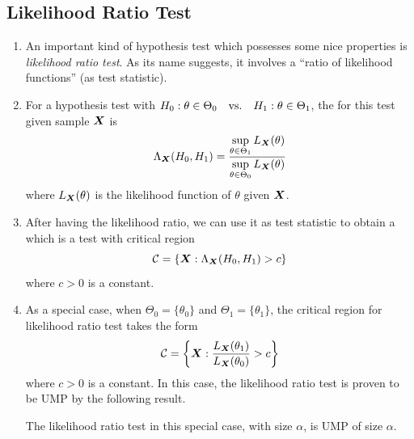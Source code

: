 \subsection{Likelihood Ratio Test}
\begin{enumerate}
\item An important kind of hypothesis test which possesses some nice properties
is \emph{likelihood ratio test}. As its name suggests, it involves a ``ratio
of likelihood functions'' (as test statistic).

\item For a hypothesis test with
\(H_0:\theta\in\Theta_0\qqtext{vs.}H_1:\theta\in\Theta_1\), the
 for this test given sample \(\vb*{X}\) is
\[
\Lambda_{\vb*{X}}(H_0,H_1)=\frac{\displaystyle \sup_{\theta\in\Theta_1}L_{\vb*{X}}\qty(\theta)}
{\displaystyle \sup_{\theta\in\Theta_0}L_{\vb*{X}}\qty(\theta)}
\]
where \(L_{\vb*{X}}\qty(\theta)\) is the likelihood function of \(\theta\) given
\(\vb*{X}\).

\item After having the likelihood ratio, we can use it as test statistic to
obtain a  which is a test with critical region
\[
\mathcal{C}=\{\vb*{X}:\Lambda_{\vb*{X}}(H_0,H_1)>c\}
\]
where \(c>0\) is a constant.

\item As a special case, when \(\Theta_0=\{\theta_0\}\) and
\(\Theta_1=\{\theta_1\}\), the critical region for likelihood ratio test takes
the form
\[
\mathcal{C}=\qty{\vb*{X}:\frac{L_{\vb*{X}}\qty(\theta_1)}{L_{\vb*{X}}\qty(\theta_0)}>c}
\]
where \(c>0\) is a constant.
In this case, the likelihood ratio test is proven to be UMP by the following
result.
\begin{theorem}
\label{thm:neyman-pearson}
The likelihood ratio test in this special case, with size \(\alpha\), is UMP of
size \(\alpha\).
\end{theorem}
\end{enumerate}

